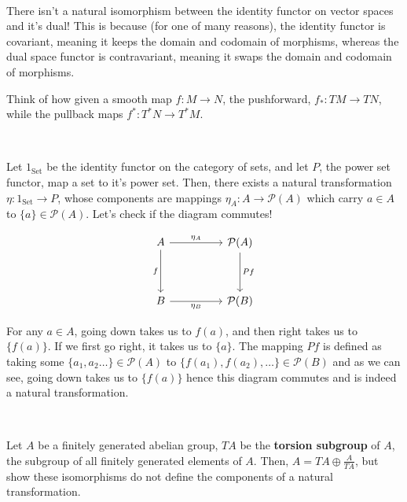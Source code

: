 \documentclass{article}
\begin{document}
\begin{example}
\

There isn't a natural isomorphism between the identity functor on vector spaces and it's dual! This is because (for one of many reasons), the identity functor is covariant, meaning it keeps the domain and codomain of morphisms, whereas the dual space functor is contravariant, meaning it swaps the domain and codomain of morphisms.

Think of how given a smooth map $f: M \to N$, the pushforward, $f_*: TM \to TN$, while the pullback maps $f^*: T^*N \to T^*M$. 
\end{example}

\begin{exercise}
\

Let $1_\text{Set}$ be the identity functor on the category of sets, and let $P$, the power set functor, map a set to it's power set. Then, there exists a natural transformation $\eta: 1_\text{Set} \to P$, whose components are mappings $\eta_A: A \to \mathcal{P}(A)$ which carry $a \in A$ to $\{a \} \in \mathcal{P}(A)$. Let's check if the diagram commutes!

\[\begin{tikzcd}
	A && \mathcal{P}(A) \\
	\\
	{B} && {\mathcal{P}(B)}
	\arrow["{\eta_A}", from=1-1, to=1-3]
	\arrow["{f}"', from=1-1, to=3-1]
	\arrow["{Pf}", from=1-3, to=3-3]
	\arrow["{\eta_B}"', from=3-1, to=3-3]
\end{tikzcd}\]

For any $a \in A$, going down takes us to $f(a)$, and then right takes us to $\{f(a)\}$. If we first go right, it takes us to $\{a\}$. The mapping $Pf$ is defined as taking some $\{a_1, a_2 \dots \} \in \mathcal{P}(A)$ to $\{f(a_1), f(a_2) ,\dots \} \in \mathcal{P}(B)$ and as we can see, going down takes us to $\{f(a)\}$ hence this diagram commutes and is indeed a natural transformation. 
\end{exercise}

\begin{proposition}
\

Let $A$ be a finitely generated abelian group, $TA$ be the \textbf{torsion subgroup} of $A$, the subgroup of all finitely generated elements of $A$. Then, $A = TA \oplus \frac{A}{TA}$, but show these isomorphisms do not define the components of a natural transformation.
\end{proposition}
\end{document}
